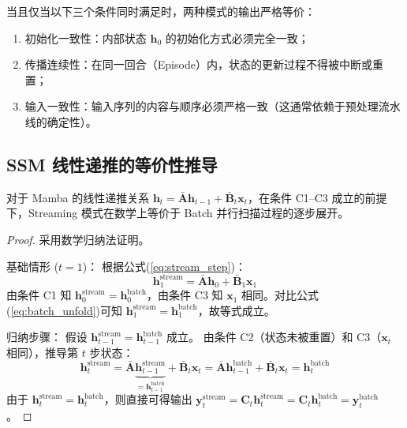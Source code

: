 当且仅当以下三个条件同时满足时，两种模式的输出严格等价：
\begin{enumerate}
    \item[C1] 初始化一致性：内部状态 $\mathbf{h}_0$ 的初始化方式必须完全一致；
    \item[C2] 传播连续性：在同一回合（Episode）内，状态的更新过程不得被中断或重置；
    \item[C3] 输入一致性：输入序列的内容与顺序必须严格一致（这通常依赖于预处理流水线的确定性）。
\end{enumerate}

\subsection{SSM 线性递推的等价性推导}

\begin{corollary}
对于 Mamba 的线性递推关系 $\mathbf{h}_t = \bar{\mathbf{A}} \mathbf{h}_{t-1} + \bar{\mathbf{B}}_t \mathbf{x}_t$，在条件 C1--C3 成立的前提下，Streaming 模式在数学上等价于 Batch 并行扫描过程的逐步展开。
\end{corollary}

\begin{proof}
采用数学归纳法证明。

基础情形 ($t=1$)：
根据公式(\ref{eq:stream_step})：
\begin{equation}
  \mathbf{h}_1^{\text{stream}} = \bar{\mathbf{A}} \mathbf{h}_0 + \bar{\mathbf{B}}_1 \mathbf{x}_1
\end{equation}
由条件 C1 知 $\mathbf{h}_0^{\text{stream}} = \mathbf{h}_0^{\text{batch}}$，由条件 C3 知 $\mathbf{x}_1$ 相同。对比公式(\ref{eq:batch_unfold})可知 $\mathbf{h}_1^{\text{stream}} = \mathbf{h}_1^{\text{batch}}$，故等式成立。

归纳步骤：
假设 $\mathbf{h}_{t-1}^{\text{stream}} = \mathbf{h}_{t-1}^{\text{batch}}$ 成立。
由条件 C2（状态未被重置）和 C3（$\mathbf{x}_t$ 相同），推导第 $t$ 步状态：
\begin{equation}
  \mathbf{h}_t^{\text{stream}} = \bar{\mathbf{A}} \underbrace{\mathbf{h}_{t-1}^{\text{stream}}}_{= \mathbf{h}_{t-1}^{\text{batch}}} + \bar{\mathbf{B}}_t \mathbf{x}_t = \bar{\mathbf{A}} \mathbf{h}_{t-1}^{\text{batch}} + \bar{\mathbf{B}}_t \mathbf{x}_t = \mathbf{h}_t^{\text{batch}}
\end{equation}
由于 $\mathbf{h}_t^{\text{stream}} = \mathbf{h}_t^{\text{batch}}$，则直接可得输出 $\mathbf{y}_t^{\text{stream}} = \mathbf{C}_t \mathbf{h}_t^{\text{stream}} = \mathbf{C}_t \mathbf{h}_t^{\text{batch}} = \mathbf{y}_t^{\text{batch}}$。
\end{proof}

